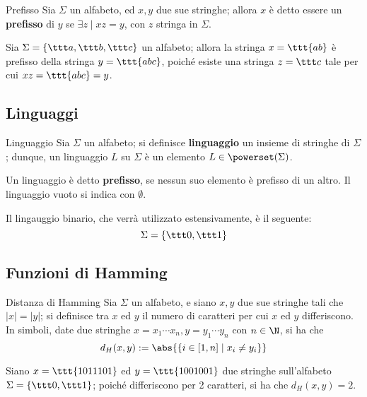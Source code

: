 \documentclass[a4paper, 12pt]{report}
\begin{document}
    \begin{frameddefn}{Prefisso}
        Sia $\Sigma$ un alfabeto, ed $x, y$ due sue stringhe; allora $x$ è detto essere un \textbf{prefisso} di $y$ se $\exists z \mid xz = y$, con $z$ stringa in $\Sigma$.
    \end{frameddefn}

    \begin{example}[Prefisso]
        Sia $\Sigma = \{\ttt a,\ttt  b,\ttt  c\}$ un alfabeto; allora la stringa $x = \ttt{ab}$ è prefisso della stringa $y = \ttt{abc}$, poiché esiste una stringa $z = \ttt c$ tale per cui $xz = \ttt{abc} = y$.
    \end{example}
    
    \subsection{Linguaggi}

    \begin{frameddefn}{Linguaggio}
        Sia $\Sigma$ un alfabeto; si definisce \textbf{linguaggio} un insieme di stringhe di $\Sigma$; dunque, un linguaggio $L$ su $\Sigma$ è un elemento $L \in \powerset(\Sigma)$.

        Un linguaggio è detto \textbf{prefisso}, se nessun suo elemento è prefisso di un altro. Il linguaggio vuoto si indica con $\emptyset$.
    \end{frameddefn}

    \begin{example}
        Il lingauggio binario, che verrà utilizzato estensivamente, è il seguente: $$\Sigma = \{ \ttt 0, \ttt 1 \}$$
    \end{example}

    \subsection{Funzioni di Hamming}

    \begin{frameddefn}{Distanza di Hamming}
        Sia $\Sigma$ un alfabeto, e siano $x, y$ due sue stringhe tali che $|x| = |y|$; si definisce  tra $x$ ed $y$ il numero di caratteri per cui $x$ ed $y$ differiscono. In simboli, date due stringhe $x = x_1 \cdots x_n, y = y_1 \cdots y_n$ con $n \in \N$, si ha che $$d_H(x, y) := \abs{\{i \in [1, n] \mid x_i \neq y_i \}}$$
    \end{frameddefn}

    \begin{example}
        Siano $x = \ttt{1011101}$ ed $y = \ttt{1001001}$ due stringhe sull'alfabeto $\Sigma = \{ \ttt 0, \ttt 1 \}$; poiché differiscono per 2 caratteri, si ha che $d_H(x, y) = 2$.
    \end{example}
\end{document}
